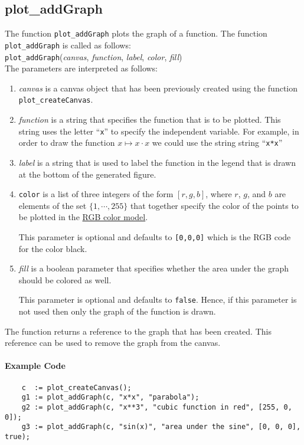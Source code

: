 \subsection{plot\_addGraph}
The function \texttt{plot\_addGraph} plots the graph of a function.
The function \texttt{plot\_addGraph} is called as follows:
\\[0.2cm]
\hspace*{1.3cm}
\texttt{plot\_addGraph}(\textsl{canvas}, \textsl{function}, \textsl{label}, \textsl{color}, \textsl{fill})
\\[0.2cm]
The parameters are interpreted as follows:
\begin{enumerate}
 \item \textsl{canvas} is a canvas object that has been previously created using the function
       \texttt{plot\_createCanvas}.  
\item \textsl{function} is a string that specifies the function that is to be plotted.
      This string uses the letter ``\texttt{x}'' to specify the independent variable.
      For example, in order to draw the function $x \mapsto x \cdot x$ we could use the string
      string ``\texttt{x*x}''
\item \textsl{label} is a string that is used to label the function in the legend that is drawn at
      the bottom of the generated figure.
\item \texttt{color} is a list of three integers of the form $[r,g,b]$, where $r$, $g$, and $b$ are
      elements of the set $\{1, \cdots, 255\}$ that together specify the color of the points
      to be plotted in the \href{https://en.wikipedia.org/wiki/RGB_color_model}{RGB color model}.

      This parameter is optional and defaults to \texttt{[0,0,0]} which is the RGB code for the
      color black.
\item \textsl{fill} is a boolean parameter that specifies whether the area under the graph should be
      colored as well.  

      This parameter is optional and defaults to \texttt{false}.  Hence, if this
      parameter is not used then only the graph of the function is drawn.
\end{enumerate}
The function returns a reference to the graph that has been created.  This reference can be used
to remove the graph from the canvas.
 
\paragraph{Example Code}
\begin{verbatim}
    c  := plot_createCanvas();
    g1 := plot_addGraph(c, "x*x", "parabola");
    g2 := plot_addGraph(c, "x**3", "cubic function in red", [255, 0, 0]);
    g3 := plot_addGraph(c, "sin(x)", "area under the sine", [0, 0, 0], true);
\end{verbatim}


